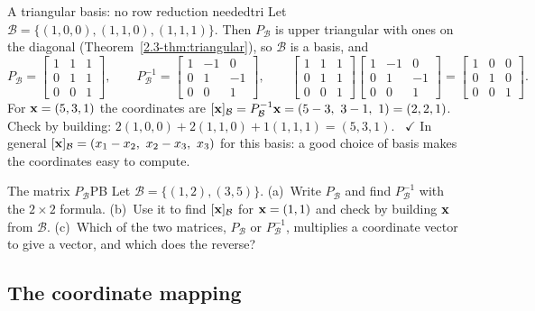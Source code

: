 \documentclass[11pt]{article}
\begin{document}
\begin{exmp}{A triangular basis: no row reduction needed}{tri}
Let $\mathcal{B}=\{(1,0,0),(1,1,0),(1,1,1)\}$. Then $P_{\mathcal{B}}$ is upper triangular with ones on the diagonal (Theorem~\ref{2.3-thm:triangular}), so $\mathcal{B}$ is a basis, and
\[
P_{\mathcal{B}}=\begin{bmatrix}1&1&1\\0&1&1\\0&0&1\end{bmatrix},\qquad
P_{\mathcal{B}}^{-1}=\begin{bmatrix}1&-1&0\\0&1&-1\\0&0&1\end{bmatrix},\qquad
\begin{bmatrix}1&1&1\\0&1&1\\0&0&1\end{bmatrix}\begin{bmatrix}1&-1&0\\0&1&-1\\0&0&1\end{bmatrix}=\begin{bmatrix}1&0&0\\0&1&0\\0&0&1\end{bmatrix}.
\]
For $\mathbf{x}=(5,3,1)$ the coordinates are $[\bv{x}]_{\mathcal{B}}=P_{\mathcal{B}}^{-1}\bv{x}=(5-3,\ 3-1,\ 1)=(2,2,1)$. Check by building: $2(1,0,0)+2(1,1,0)+1(1,1,1)=(5,3,1)$. \ $\checkmark$ In general $[\bv{x}]_{\mathcal{B}}=(x_1-x_2,\ x_2-x_3,\ x_3)$ for this basis: a good choice of basis makes the coordinates easy to compute.
\end{exmp}

\begin{kc}{The matrix $P_{\mathcal{B}}$}{PB}
Let $\mathcal{B}=\{(1,2),(3,5)\}$. (a)~Write $P_{\mathcal{B}}$ and find $P_{\mathcal{B}}^{-1}$ with the $2\times2$ formula. (b)~Use it to find $[\mathbf{x}]_{\mathcal{B}}$ for $\mathbf{x}=(1,1)$ and check by building $\mathbf{x}$ from $\mathcal{B}$. (c)~Which of the two matrices, $P_{\mathcal{B}}$ or $P_{\mathcal{B}}^{-1}$, multiplies a coordinate vector to give a vector, and which does the reverse?
\end{kc}

\subsection*{The coordinate mapping}
\end{document}
